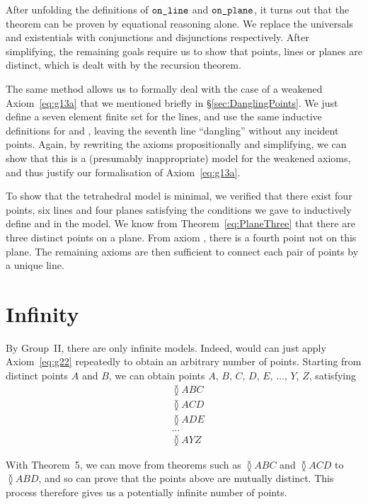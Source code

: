 After unfolding the definitions of $\texttt{on\_line}$ and $\texttt{on\_plane}$, it turns out that the theorem can be proven by equational reasoning alone. We replace the universals and existentials with conjunctions and disjunctions respectively. After simplifying, the remaining goals require us to show that points, lines or planes are distinct, which is dealt with by the recursion theorem.

The same method allows us to formally deal with the case of a weakened Axiom~\ref{eq:g13a} that we mentioned briefly in \S\ref{sec:DanglingPoints}. We just define a seven element finite set for the lines, and use the same inductive definitions for  and , leaving the seventh line ``dangling'' without any incident points. Again, by rewriting the axioms propositionally and simplifying, we can show that this is a (presumably inappropriate) model for the weakened axioms, and thus justify our formalisation of Axiom~\ref{eq:g13a}.

To show that the tetrahedral model is minimal, we verified that there exist four points, six lines and four planes satisfying the conditions we gave to inductively define  and  in the model. We know from Theorem~\ref{eq:PlaneThree} that there are three distinct points on a plane. From axiom , there is a fourth point not on this plane. The remaining axioms are then sufficient to connect each pair of points by a unique line.

\section{Infinity}\label{sec:Infinity}
By Group~II, there are only infinite models. Indeed, would can just apply Axiom~\ref{eq:g22} repeatedly to obtain an arbitrary number of points. Starting from distinct points $A$ and $B$, we can obtain points $A$, $B$, $C$, $D$, $E$, $\ldots$, $Y$, $Z$, satisfying 
\begin{align*}
&\between{A}{B}{C}\\
&\between{A}{C}{D}\\
&\between{A}{D}{E}\\
&\ldots\\
&\between{A}{Y}{Z}
\end{align*}

With Theorem~5, we can move from theorems such as $\between{A}{B}{C}$ and $\between{A}{C}{D}$ to $\between{A}{B}{D}$, and so can prove that the points above are mutually distinct. This process therefore gives us a potentially infinite number of points.

